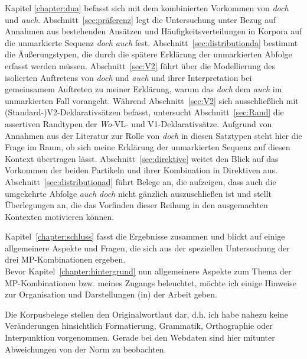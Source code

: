 Kapitel \ref{chapter:dua} befasst sich mit dem kombinierten Vorkommen von \textit{doch} und \textit{auch}. Abschnitt~\ref{sec:präferenz} legt die Untersuchung unter Bezug auf Annahmen aus bestehenden Ansätzen und Häufigkeitsverteilungen in Korpora auf die unmarkierte Sequenz \textit{doch auch} fest. Abschnitt~\ref{sec:distributionda} bestimmt die Äuße\-rungstypen, die durch die spätere Erklärung der unmarkierten Abfolge erfasst werden müssen. Abschnitt~\ref{sec:V2} führt über die Modellierung des isolierten Auftretens von \textit{doch} und \textit{auch} und ihrer Interpretation bei gemeinsamem Auftreten zu meiner Erklärung, warum das \textit{doch} dem \textit{auch} im unmarkierten Fall vorangeht. Während Abschnitt~\ref{sec:V2} sich aus\-schließlich mit (Standard-)V2-Deklarativsätzen befasst, untersucht Abschnitt~\ref{sec:Rand} die assertiven Randtypen der \textit{Wo}-VL- und V1-Deklarativsätze. Aufgrund von Annahmen aus der Literatur zur Rolle von \textit{doch} in diesen Satztypen steht hier die Frage im Raum, ob sich meine Erklärung der unmarkierten Sequenz auf diesen Kontext übertragen lässt. Abschnitt~\ref{sec:direktive} weitet den Blick auf das Vorkommen der beiden Partikeln und ihrer Kombination in Direktiven aus. Abschnitt~\ref{sec:distributionad} führt Belege an, die aufzeigen, dass auch die umgekehrte Abfolge \textit{auch doch} nicht gänz\-lich auszuschließen ist und stellt Überlegungen an, die das Vorfinden dieser Reihung in den ausgemach\-ten Kontexten motivieren können.\pagebreak

Kapitel~\ref{chapter:schluss} fasst die Ergebnisse zusammen und blickt auf einige allgemeinere Aspekte und Fragen, die sich aus der speziellen Untersuchung der drei MP-Kombi\-nationen ergeben.\\

\noindent
Bevor Kapitel~\ref{chapter:hintergrund} nun allgemeinere Aspekte zum Thema der MP-Kom\-bi\-na\-ti\-on\-en bzw. meines Zugangs beleuchtet, möchte ich einige Hinweise zur Organisation und Darstellungen (in) der Arbeit geben.

Die Korpusbelege stellen den Originalwortlaut dar, d.h. ich habe nahezu keine Veränderungen hinsichtlich Formatierung, Grammatik, Orthographie oder Interpunktion vorgenommen. Gerade bei den Webdaten sind hier mitunter Abwei\-chungen von der Norm zu beobachten.

